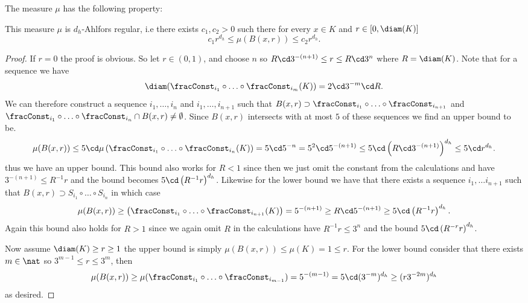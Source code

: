 The measure $\mu$ has the following property: 
\begin{prop}\label{normalziedHausdorffMeasureAhlforsRegular}
	This measure $\mu$ is $d_h$-Ahlfors regular, i.e there exists $c_1, c_2 > 0$ such there for every $x \in K$ and $r \in [0, \diam(K)]$
	\begin{equation}
		c_1r^{d_h} \leq \mu(B(x,r)) \leq c_2 r^{d_h}.
	\end{equation}
\end{prop}
\begin{proof}
	If $r = 0$ the proof is obvious. So let $r \in (0, 1)$, and choose $n$ so $R \cd 3^{-(n+1)} \leq r \leq R \cd 3^{n}$ where $R = \diam(K)$. Note that for a sequence we have 
	$$\diam(\fracConst_{i_1} \circ \ldots \circ \fracConst_{i_{m}}(K))= 2\cd 3^{-m}\cd R.$$ 
	We can therefore construct a sequence $i_1, \ldots, i_n$ and $i_1, \ldots, i_{n+1}$ such that $B(x,r)\supset \fracConst_{i_1} \circ \ldots \circ \fracConst_{i_{n+1}}$ and $\fracConst_{i_1} \circ \ldots \circ \fracConst_{i_{n}} \cap B(x,r) \neq \emptyset$. Since $B(x,r)$ intersects with at most $5$ of these sequences we find an upper bound to be. 
	\begin{equation}
		\mu(B(x,r)) \leq 5\cd \mu\left(\fracConst_{i_1} \circ \ldots \circ \fracConst_{i_n}(K)\right) = 5\cd 5^{-n} = 5^2\cd5 ^{-(n+1)} \leq 5 \cd \left(R\cd 3^{-(n+1)}\right)^{d_h} \leq 5 \cd r^{d_h}.
	\end{equation} 
	thus we have an upper bound. This bound also works for $R < 1$ since then we just omit the constant from the calculations and have $3^{-(n+1)} \leq R^{-1}r$ and the bound becomes $5\cd \left(R^{-1} r\right)^{d_h}$. Likewise for the lower bound we have that there exists a sequence $i_1, \ldots i_{n+1}$ such that $B(x,r)\supset S_{i_1} \circ \ldots \circ S_{i_n}$ in which case
	\begin{equation}
		\mu(B(x,r)) \geq \left(\fracConst_{i_1} \circ \ldots \circ \fracConst_{i_{n+1}}(K)\right) = 5^{-(n+1)} \geq R\cd 5^{-(n+1)} \geq  5\cd \left(R^{-1}r\right)^{d_h}.
	\end{equation}
	Again this bound also holds for $R >1$ since we again omit $R$ in the calculations have $R^{-1}r \leq 3^{n}$ and the bound $5 \cd \left(R^{-r}r\right)^{d_h}$.
	
	Now assume $\diam(K) \geq r \geq 1$ the upper bound is simply $\mu(B(x,r)) \leq \mu(K) = 1 \leq r$. For the lower bound consider that there exists $m \in \nat$ so $3^{m-1}\leq  r \leq 3^{m}$, then
	\begin{equation}
		\mu(B(x,r)) \geq \mu(\fracConst_{i_1} \circ \ldots \circ \fracConst_{i_{m-1}}) = 5^{-(m-1)} = 5 \cd (3^{-m})^{d_h} \geq  (r3^{-2m})^{d_h}
	\end{equation}
	as desired.
\end{proof}

